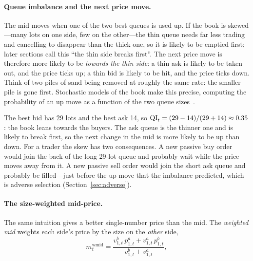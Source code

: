 \paragraph{Queue imbalance and the next price move.}
The mid moves when one of the two best queues is used up. If the book is skewed---many lots on one
side, few on the other---the thin queue needs far less trading and cancelling to disappear than the
thick one, so it is likely to be emptied first; later sections call this ``the thin side breaks first''. The next price move is therefore more likely to be
\emph{towards the thin side}: a thin ask is likely to be taken out, and the price ticks up; a thin
bid is likely to be hit, and the price ticks down. Think of two piles of sand being removed at
roughly the same rate: the smaller pile is gone first. Stochastic models of the book make this
precise, computing the probability of an up move as a function of the two queue sizes~\citep{cst2010}.

\begin{example}
The best bid has 29 lots and the best ask 14, so
$\mathrm{QI}_t = (29 - 14)/(29 + 14) \approx 0.35$: the book leans towards the buyers. The ask queue is the
thinner one and is likely to break first, so the next change in the mid is more likely to be up
than down. For a trader the skew has two consequences. A new passive buy
order would join the back of the long 29-lot queue and probably wait while the price moves away
from it. A new passive sell order would join the short ask queue and probably be filled---just
before the up move that the imbalance predicted, which is adverse selection
(Section~\ref{sec:adverse}).
\end{example}

\paragraph{The size-weighted mid-price.} The same intuition gives a better single-number price
than the mid. The \emph{weighted mid} weights each side's price by the size on the \emph{other}
side,
\begin{equation}
  m^{\text{wmid}}_t = \frac{v^b_{1,t}\, p^a_{1,t} + v^a_{1,t}\, p^b_{1,t}}{v^b_{1,t} + v^a_{1,t}},
\end{equation}

